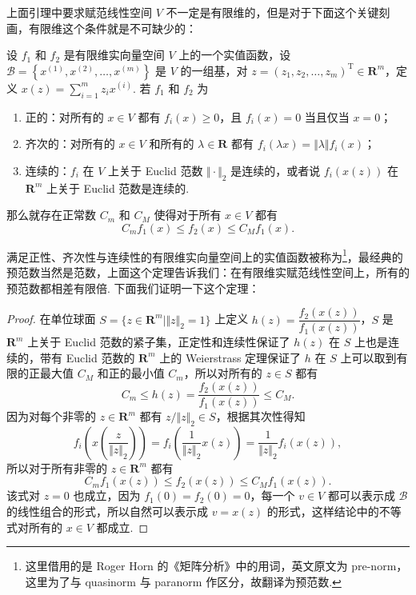 上面引理中要求赋范线性空间 $V$ 不一定是有限维的，但是对于下面这个关键刻画，有限维这个条件就是不可缺少的：

\begin{theorem}{}{}
    设 $f_1$ 和 $f_2$ 是有限维实向量空间 $V$ 上的一个实值函数，设 $\mathcal{B} = \left\{x^{(1)}, x^{(2)}, \ldots, x^{(m)}\right\}$ 是 $V$ 的一组基，对 $z = (z_1, z_2, \ldots, z_m)^\mathrm{T}\in \mathbf{R}^m$，定义 $x(z) = \sum\limits_{i=1}^{m}z_ix^{(i)}$. 若 $f_1$ 和 $f_2$ 为
    \begin{enumerate}
        \item 正的：对所有的 $x\in V$ 都有 $f_i(x)\geqslant 0$，且 $f_i(x) = 0$ 当且仅当 $x = 0$；
        \item 齐次的：对所有的 $x\in V$ 和所有的 $\lambda\in\mathbf{R}$ 都有 $f_i(\lambda x) = \Vert \lambda\Vert f_i(x)$；
        \item 连续的：$f_i$ 在 $V$ 上关于 Euclid 范数 $\Vert\cdot\Vert_2$ 是连续的，或者说 $f_i(x(z))$ 在 $\mathbf{R}^m$ 上关于 Euclid 范数是连续的.
    \end{enumerate}
    那么就存在正常数 $C_m$ 和 $C_M$ 使得对于所有 $x\in V$ 都有 \[C_mf_1(x) \leqslant f_2(x) \leqslant C_Mf_1(x).\]
\end{theorem}

满足正性、齐次性与连续性的有限维实向量空间上的实值函数被称为\footnote{这里借用的是 Roger Horn 的《矩阵分析》中的用词，英文原文为 pre-norm，这里为了与 quasinorm 与 paranorm 作区分，故翻译为预范数.}，最经典的预范数当然是范数，上面这个定理告诉我们：在有限维实赋范线性空间上，所有的预范数都相差有限倍. 下面我们证明一下这个定理：

\begin{proof}
    在单位球面 $S = \{z\in \mathbf{R}^m \mid \Vert z\Vert_2 = 1\}$ 上定义 $h(z) = \dfrac{f_2(x(z))}{f_1(x(z))}$，$S$ 是 $\mathbf{R}^m$ 上关于 Euclid 范数的紧子集，正定性和连续性保证了 $h(z)$ 在 $S$ 上也是连续的，带有 Euclid 范数的 $\mathbf{R}^m$ 上的 Weierstrass 定理保证了 $h$ 在 $S$ 上可以取到有限的正最大值 $C_M$ 和正的最小值 $C_m$，所以对所有的 $z\in S$ 都有 \[C_m\leqslant h(z) = \frac{f_2(x(z))}{f_1(x(z))}\leqslant C_M.\]
    因为对每个非零的 $z\in\mathbf{R}^m$ 都有 $z/\Vert z\Vert_2\in S$，根据其次性得知 \[f_i\left(x\left(\frac{z}{\Vert z\Vert_2}\right)\right) = f_i\left(\frac{1}{\Vert z\Vert_2}x(z)\right) = \frac{1}{\Vert z\Vert_2}f_i(x(z)),\]
    所以对于所有非零的 $z\in\mathbf{R}^m$ 都有 \[C_m f_1(x(z))\leqslant f_2(x(z))\leqslant C_M f_1(x(z)).\]
    该式对 $z = 0$ 也成立，因为 $f_1(0) = f_2(0) = 0$，每一个 $v\in V$ 都可以表示成 $\mathcal{B}$ 的线性组合的形式，所以自然可以表示成 $v = x(z)$ 的形式，这样结论中的不等式对所有的 $x\in V$ 都成立.
\end{proof}

